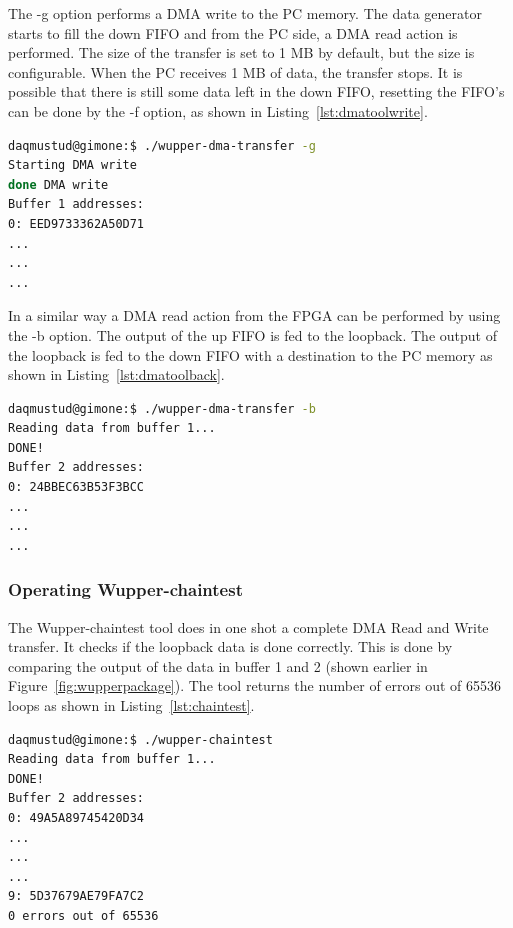 The -g option performs a DMA write to the PC memory. The data generator starts to fill the down FIFO and from the PC side, a DMA read action is performed. The size of the transfer is set to 1 MB by default, but the size is configurable. When the PC receives 1 MB of data, the transfer stops. It is possible that there is still some data left in the down FIFO, resetting the FIFO's can be done by the -f option, as shown in Listing~\ref{lst:dmatoolwrite}.

\begin{lstlisting}[language=BASH, frame=single, label={lst:dmatoolwrite}, caption=Start generating data to the target.]
daqmustud@gimone:$ ./wupper-dma-transfer -g
Starting DMA write
done DMA write 
Buffer 1 addresses:
0: EED9733362A50D71 
...
...
...
\end{lstlisting}

\newpage

In a similar way a DMA read action from the FPGA can be performed by using the -b option. The output of the up FIFO is fed to the loopback. The output of the loopback is fed to the down FIFO with a destination to the PC memory as shown in Listing~\ref{lst:dmatoolback}.

\begin{lstlisting}[language=BASH, frame=single, label={lst:dmatoolback}, caption= Performing a DMA read and DMA write]
daqmustud@gimone:$ ./wupper-dma-transfer -b
Reading data from buffer 1...
DONE!
Buffer 2 addresses:
0: 24BBEC63B53F3BCC 
...
...
...
\end{lstlisting}

\subsubsection{Operating Wupper-chaintest}
The Wupper-chaintest tool does in one shot a complete DMA Read and Write transfer. It checks if the loopback data is done correctly. This is done by comparing the output of the data in buffer 1 and 2 (shown earlier in Figure~\ref{fig:wupperpackage}). The tool returns the number of errors out of 65536 loops as shown in Listing~\ref{lst:chaintest}.
\begin{lstlisting}[language=BASH, frame=single, label={lst:chaintest}, caption=Output of Wupper-chaintest]
daqmustud@gimone:$ ./wupper-chaintest      
Reading data from buffer 1...
DONE!
Buffer 2 addresses:
0: 49A5A89745420D34 
...
...
... 
9: 5D37679AE79FA7C2 
0 errors out of 65536
\end{lstlisting}

